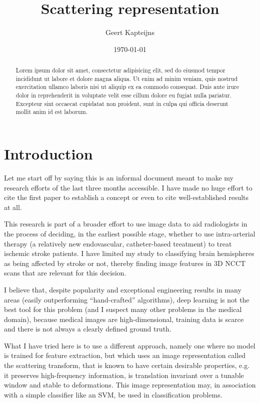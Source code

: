 \documentclass[twocolumn, openany, oneside, article]{memoir}
\title{Scattering representation}
\author{Geert Kapteijns}
\date{\today}
\begin{document}
\maketitle
\pagestyle{simple}

\begin{abstract}

Lorem ipsum dolor sit amet, consectetur adipisicing elit, sed do eiusmod
tempor incididunt ut labore et dolore magna aliqua. Ut enim ad minim veniam,
quis nostrud exercitation ullamco laboris nisi ut aliquip ex ea commodo
consequat. Duis aute irure dolor in reprehenderit in voluptate velit esse
cillum dolore eu fugiat nulla pariatur. Excepteur sint occaecat cupidatat non
proident, sunt in culpa qui officia deserunt mollit anim id est laborum.

\end{abstract}

\chapter{Introduction}

Let me start off by saying this is an informal document meant to make my
research efforts of the last three months accessible. I have made no huge effort
to cite the first paper to establish a concept or even to cite well-established
results at all.

This research is part of a broader effort to use image data to aid radiologists in the process of deciding, in
the earliest possible stage, whether to use intra-arterial therapy (a relatively new endovascular, catheter-based
treatment) to treat ischemic stroke patients.
I have limited my study to classifying brain hemispheres as being affected by stroke or not, thereby finding image features in 3D NCCT scans that are relevant for this decision.

I believe that,
despite popularity and exceptional engineering results in many areas (easily outperforming \enquote{hand-crafted}
algorithms), deep learning is not the best tool for this problem (and I suspect many other problems in the medical
domain), because medical images are high-dimensional, training data is scarce and there is not always a clearly defined
ground truth.

What I have tried here is to use a different approach, namely one where no model is trained for feature extraction, but
which uses an image representation called the scattering transform, that is known to have certain desirable properties,
e.g. it preserves high-frequency information, is translation invariant over a tunable window and stable to deformations.
This image representation may, in association with a simple classifier like an SVM, be used in classification problems.
\end{document}
